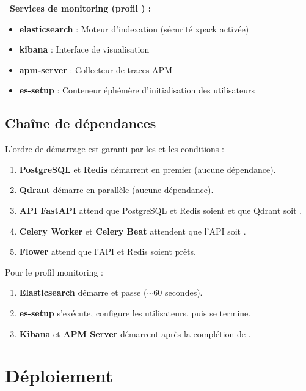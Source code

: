 \begin{processbox}
\textbf{\textcolor{arasPrimary}{\faChartLine\ Services de monitoring (profil ) :}}
\begin{itemize}
    \item \textbf{elasticsearch} : Moteur d'indexation (sécurité xpack activée)
    \item \textbf{kibana} : Interface de visualisation
    \item \textbf{apm-server} : Collecteur de traces APM
    \item \textbf{es-setup} : Conteneur éphémère d'initialisation des utilisateurs
\end{itemize}
\end{processbox}

\subsection{Chaîne de dépendances}

L'ordre de démarrage est garanti par les  et les conditions  :

\begin{enumerate}
    \item \textbf{PostgreSQL} et \textbf{Redis} démarrent en premier (aucune dépendance).
    \item \textbf{Qdrant} démarre en parallèle (aucune dépendance).
    \item \textbf{API FastAPI} attend que PostgreSQL et Redis soient  et que Qdrant soit .
    \item \textbf{Celery Worker} et \textbf{Celery Beat} attendent que l'API soit .
    \item \textbf{Flower} attend que l'API et Redis soient prêts.
\end{enumerate}

Pour le profil monitoring :
\begin{enumerate}
    \item \textbf{Elasticsearch} démarre et passe  ($\sim$60 secondes).
    \item \textbf{es-setup} s'exécute, configure les utilisateurs, puis se termine.
    \item \textbf{Kibana} et \textbf{APM Server} démarrent après la complétion de .
\end{enumerate}

\section{Déploiement}

